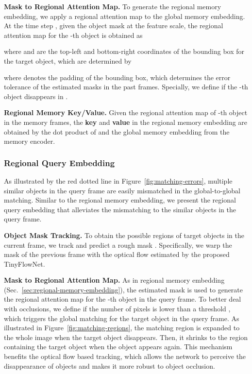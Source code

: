 \documentclass[final]{cvpr}
\begin{document}
\noindent \textbf{Mask to Regional Attention Map.}
To generate the regional memory embedding, we apply a regional attention map to the global memory embedding.
At the time step , given the object mask  at the feature scale, the regional attention map  for the -th object is obtained as

\vspace{-4 mm}

where  and  are the top-left and bottom-right coordinates of the bounding box for the target object, which are determined by

\vspace{-4 mm}

where 
 denotes the padding of the bounding box, which determines the error tolerance of the estimated masks in the past frames.
Specially, we define  if the -th object disappears in .

\noindent \textbf{Regional Memory Key/Value.}
Given the regional attention map  of -th object in the memory frames,
the \textbf{key}  and \textbf{value}  in the regional memory embedding are obtained by the dot product of  and the global memory embedding from the memory encoder.

\vspace{-3 mm}
\subsubsection{Regional Query Embedding}

As illustrated by the red dotted line in Figure~\ref{fig:matching-errors}, multiple similar objects in the query frame are easily mismatched in the global-to-global matching.
Similar to the regional memory embedding, we present the regional query embedding that alleviates the mismatching  to the similar objects in the query frame.

\noindent \textbf{Object Mask Tracking.}
To obtain the possible regions of target objects in the current frame, we track and predict a rough mask .
Specifically, we warp the mask  of the previous frame with the optical flow  estimated by the proposed TinyFlowNet.


\noindent \textbf{Mask to Regional Attention Map.}
As in regional memory embedding (Sec.~\ref{sec:regional-memory-embedding}), the estimated mask  is used to generate the regional attention map  for the -th object in the query frame.
To better deal with occlusions, we define  if the number of pixels is lower than a threshold , which triggers the global matching for the target object in the query frame.
As illustrated in Figure~\ref{fig:matching-regions}, the matching region is expanded to the whole image when the target object disappears.
Then, it shrinks to the region containing the target object when the object appears again.
This mechanism benefits the optical flow based tracking, which allows the network to perceive the disappearance of objects and makes it more robust to object occlusion.
\end{document}
